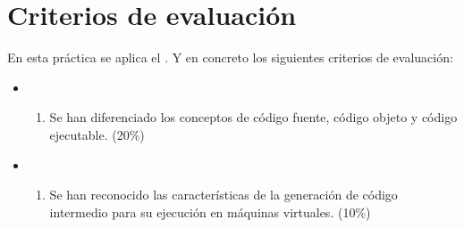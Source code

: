 \documentclass[letterpaper,10pt,spanish]{sphinxmanual}
\begin{document}
\section{Criterios de evaluación}
\label{\detokenize{lab2:criterios-de-evaluacion}}
\sphinxAtStartPar
En esta práctica se aplica el . Y en concreto los siguientes criterios de evaluación:
\begin{itemize}
\item {} \begin{enumerate}
%
\setcounter{enumi}{2}
\item {} 
\sphinxAtStartPar
Se han diferenciado los conceptos de código fuente, código objeto y código ejecutable. (20\%)

\end{enumerate}

\item {} \begin{enumerate}
%
\setcounter{enumi}{3}
\item {} 
\sphinxAtStartPar
Se han reconocido las características de la generación de código intermedio para su ejecución en máquinas virtuales. (10\%)

\end{enumerate}

\end{itemize}



\renewcommand{\indexname}{Índice}
\footnotesize\raggedright\printindex
\end{document}
